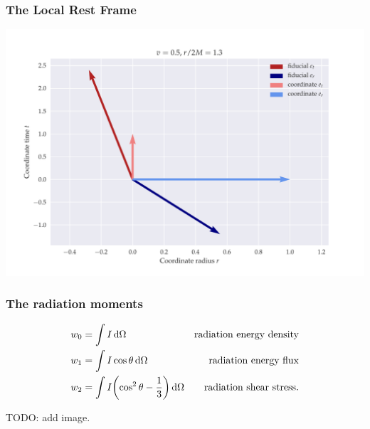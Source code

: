 \documentclass{beamer}
\begin{document}
\begin{frame}
    \frametitle{The Local Rest Frame}
        \includegraphics[width=\textwidth]{figures/high_speed}
\end{frame}

\begin{frame}
    \frametitle{The radiation moments}

    \begin{subequations}
    \begin{align*}
      w_0 &= \int I \dd{\Omega} & \text{radiation energy density} \\
      w_1 &= \int I \cos \theta \dd{\Omega} & \text{radiation energy flux} \\
      w_2 &= \int I \qty(\cos^2 \theta - \frac{1}{3}) \dd{\Omega} & \text{radiation shear stress.}
    \end{align*}
    \end{subequations}

    TODO: add image.
\end{frame}
\end{document}
